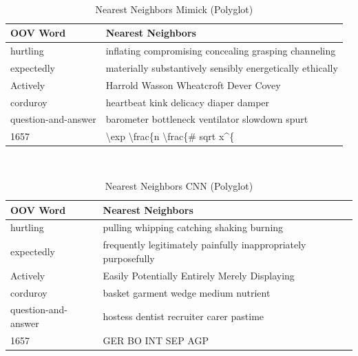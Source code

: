         \begin{table}[H]
          \begin{center}
            \caption{Nearest Neighbors Mimick (Polyglot)}
            ~\\
            \footnotesize
            \label{tab:nearest:lstm-polyglot}
            \begin{tabular}{l|l}
              \textbf{OOV Word} & \textbf{Nearest Neighbors}\\
              \hline
              hurtling & inflating compromising concealing grasping channeling\\
              expectedly & materially substantively sensibly energetically ethically\\
              Actively & Harrold Wasson Wheatcroft Dever Covey\\
              corduroy & heartbeat kink delicacy diaper damper\\
              question-and-answer & barometer bottleneck ventilator slowdown spurt\\
              1657 & \textbackslash exp \textbackslash frac\{n \textbackslash frac\{\# sqrt x\^{}\{\\
            \end{tabular}
          \end{center}
        \end{table}

        \begin{table}[H]
          \begin{center}
            \caption{Nearest Neighbors CNN (Polyglot)}
            ~\\
            \footnotesize
            \label{tab:nearest:cnn-polyglot}
            \begin{tabular}{l|l}
              \textbf{OOV Word} & \textbf{Nearest Neighbors}\\
              \hline
              hurtling & pulling whipping catching shaking burning\\
              expectedly & frequently legitimately painfully inappropriately purposefully\\
              Actively & Easily Potentially Entirely Merely Displaying\\
              corduroy & basket garment wedge medium nutrient\\
              question-and-answer & hostess dentist recruiter carer pastime\\
              1657 & GER BO INT SEP AGP\\
            \end{tabular}
          \end{center}
        \end{table}

